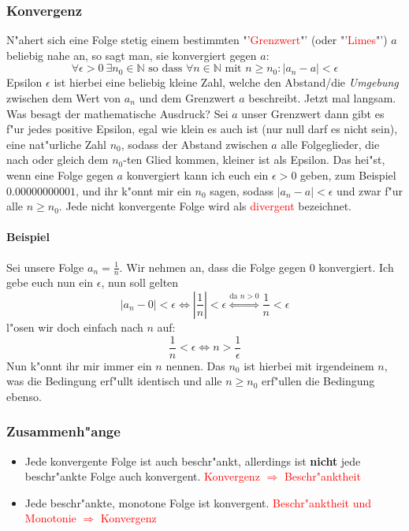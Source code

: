 \subsubsection{Konvergenz}
N"ahert sich eine Folge stetig einem bestimmten "'\textcolor{red}{Grenzwert}"' (oder "'\textcolor{red}{Limes}"') $a$ beliebig nahe an, so sagt man, sie konvergiert gegen $a$:
\begin{equation*}
\forall \epsilon > 0 \ \exists n_0  \in \mathbb{N} \text{ so dass } \forall n \in \mathbb{N} \text{ mit } n \geq n_0 : |a_n - a|< \epsilon
\end{equation*}
Epsilon $\epsilon$ ist hierbei eine beliebig kleine Zahl, welche den Abstand/die \textit{Umgebung} zwischen dem Wert von $a_n$ und dem Grenzwert $a$ beschreibt. Jetzt mal langsam. Was besagt der mathematische Ausdruck? Sei $a$ unser Grenzwert dann gibt es f"ur jedes positive Epsilon, egal wie klein es auch ist (nur null darf es nicht sein), eine nat"urliche Zahl $n_0$, sodass der Abstand zwischen $a$ alle Folgeglieder, die nach oder gleich dem $n_0$-ten Glied kommen, kleiner ist als Epsilon. Das hei"st, wenn eine Folge gegen $a$ konvergiert kann ich euch ein $\epsilon > 0$ geben, zum Beispiel $0.00000000001$, und ihr k"onnt mir ein $n_0$ sagen, sodass $|a_n - a| < \epsilon$ und zwar f"ur alle $n \geq n_0$. Jede nicht konvergente Folge wird als \textcolor{red}{divergent} bezeichnet.

\paragraph{Beispiel}
Sei unsere Folge $a_n = \frac{1}{n}$. Wir nehmen an, dass die Folge gegen $0$ konvergiert. Ich gebe euch nun ein $\epsilon$, nun soll gelten 
\begin{equation*}
|a_n - 0| < \epsilon \iff \left|\frac{1}{n}\right| < \epsilon \stackrel{\text{da } n > 0}{\iff} \frac{1}{n} < \epsilon
\end{equation*}
l"osen wir doch einfach nach $n$ auf:
\begin{equation*}
\frac{1}{n} < \epsilon \iff n > \frac{1}{\epsilon}
\end{equation*}
Nun k"onnt ihr mir immer ein $n$ nennen. Das $n_0$ ist hierbei mit irgendeinem $n$, was die Bedingung erf"ullt identisch und alle $n \geq n_0$ erf"ullen die Bedingung ebenso.

\subsubsection{Zusammenh"ange}
\begin{itemize}
\item Jede konvergente Folge ist auch beschr"ankt, allerdings ist \textbf{nicht} jede beschr"ankte Folge auch konvergent. \textcolor{red}{Konvergenz $\Rightarrow$ Beschr"anktheit}
\item Jede beschr"ankte, monotone Folge ist konvergent. \textcolor{red}{Beschr"anktheit und Monotonie $\Rightarrow$ Konvergenz}
\end{itemize}